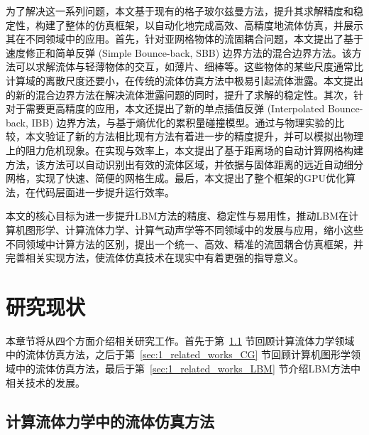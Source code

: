 为了解决这一系列问题，本文基于现有的格子玻尔兹曼方法，提升其求解精度和稳定性，构建了整体的仿真框架，以自动化地完成高效、高精度地流体仿真，并展示其在不同领域中的应用。首先，针对亚网格物体的流固耦合问题，本文提出了基于速度修正和简单反弹 (Simple Bounce-back, SBB) 边界方法的混合边界方法。该方法可以求解流体与轻薄物体的交互，如薄片、细棒等。这些物体的某些尺度通常比计算域的离散尺度还要小，在传统的流体仿真方法中极易引起流体泄露。本文提出的新的混合边界方法在解决流体泄露问题的同时，提升了求解的稳定性。其次，针对于需要更高精度的应用，本文还提出了新的单点插值反弹 (Interpolated Bounce-back, IBB) 边界方法，与基于熵优化的累积量碰撞模型。通过与物理实验的比较，本文验证了新的方法相比现有方法有着进一步的精度提升，并可以模拟出物理上的阻力危机现象。在实现与效率上，本文提出了基于距离场的自动计算网格构建方法，该方法可以自动识别出有效的流体区域，并依据与固体距离的远近自动细分网格，实现了快速、简便的网格生成。最后，本文提出了整个框架的GPU优化算法，在代码层面进一步提升运行效率。

本文的核心目标为进一步提升LBM方法的精度、稳定性与易用性，推动LBM在计算机图形学、计算流体力学、计算气动声学等不同领域中的发展与应用，缩小这些不同领域中计算方法的区别，提出一个统一、高效、精准的流固耦合仿真框架，并完善相关实现方法，使流体仿真技术在现实中有着更强的指导意义。


\section{研究现状}
本章节将从四个方面介绍相关研究工作。首先于第~\ref{sec:1_related_works_CFD} 节回顾计算流体力学领域中的流体仿真方法，之后于第~\ref{sec:1_related_works_CG} 节回顾计算机图形学领域中的流体仿真方法，最后于第~\ref{sec:1_related_works_LBM} 节介绍LBM方法中相关技术的发展。

\subsection{计算流体力学中的流体仿真方法}
\label{sec:1_related_works_CFD}
